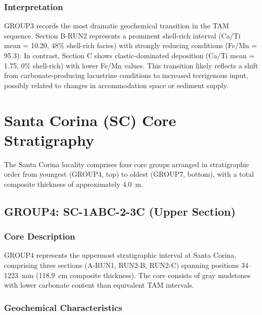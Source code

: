 \documentclass[11pt,a4paper]{article}
\newcommand{\CaTi}{Ca/Ti}  %
\newcommand{\FeMn}{Fe/Mn}
\begin{document}
\subsubsection{Interpretation}

GROUP3 records the most dramatic geochemical transition in the TAM sequence. Section B-RUN2 represents a prominent shell-rich interval (\CaTi{} mean = 10.20, 48\% shell-rich facies) with strongly reducing conditions (\FeMn{} = 95.3). In contrast, Section C shows clastic-dominated deposition (\CaTi{} mean = 1.75, 0\% shell-rich) with lower \FeMn{} values. This transition likely reflects a shift from carbonate-producing lacustrine conditions to increased terrigenous input, possibly related to changes in accommodation space or sediment supply.

\section{Santa Corina (SC) Core Stratigraphy}

The Santa Corina locality comprises four core groups arranged in stratigraphic order from youngest (GROUP4, top) to oldest (GROUP7, bottom), with a total composite thickness of approximately 4.0~m.

\subsection{GROUP4: SC-1ABC-2-3C (Upper Section)}

\subsubsection{Core Description}

GROUP4 represents the uppermost stratigraphic interval at Santa Corina, comprising three sections (A-RUN1, RUN2-B, RUN2-C) spanning positions 34--1223~mm (118.9~cm composite thickness). The core consists of gray mudstones with lower carbonate content than equivalent TAM intervals.

\subsubsection{Geochemical Characteristics}
\end{document}

